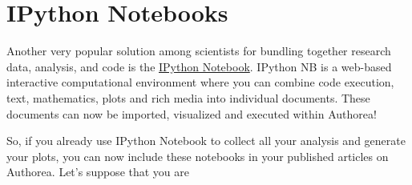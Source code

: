\section{IPython Notebooks}
Another very popular solution among scientists for bundling together research data, analysis, and code is the \href{http://ipython.org/notebook.html}{IPython Notebook}. IPython NB is a web-based interactive computational environment where you can combine code execution, text, mathematics, plots and rich media into individual documents. These documents can now be imported, visualized and executed within Authorea!

So, if you already use IPython Notebook to collect all your analysis and generate your plots, you can now include these notebooks in your published articles on Authorea. Let's suppose that you are  